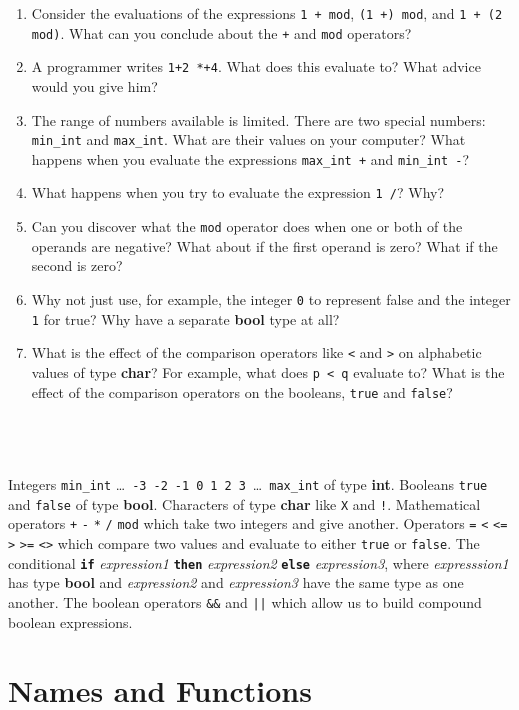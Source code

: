 \documentclass[]{book}
\newcommand\upquote[1]{\textquotesingle#1\textquotesingle}
\newcommand{\sofarstartingoff}{

\noindent 1

\noindent Integers \texttt{min\_int} \ldots\ \texttt{-3}\ \texttt{-2}\ \texttt{-1}\ \texttt{0}\ \texttt{1}\ \texttt{2}\ \texttt{3}\ \ldots\ \texttt{max\_int} of type \textbf{\textrm{int}}. Booleans \texttt{true} and \texttt{false} of type \textbf{\textrm{bool}}. \noindent Characters of type \textrm{\textbf{char}} like \texttt{\upquote{X}} and \texttt{\upquote{!}}. Mathematical operators \texttt{+} \texttt{-} \texttt{*} \texttt{/} \texttt{mod} which take two integers and give another. Operators \texttt{=} \texttt{<} \texttt{<=} \texttt{>} \texttt{>=} \texttt{<>} which compare two values and evaluate to either \texttt{true} or \texttt{false}. The conditional \textbf{\texttt{if}} \textit{expression1} \textbf{\texttt{then}} \textit{expression2} \textbf{\texttt{else}} \textit{expression3}, where \textit{expresssion1} has type \textrm{\textbf{bool}} and \textit{expression2} and \textit{expression3} have the same type as one another. The boolean operators \texttt{\&\&} and \texttt{||} which allow us to build compound boolean expressions.}
\begin{document}
\begin{enumerate}
\item Consider the evaluations of the expressions \texttt{1\! +\! mod}, \texttt{(1\! +)\! mod}, and \texttt{1\! +\! (2\! mod)}. What can you conclude about the \texttt{+} and \texttt{mod} operators?
\item A programmer writes \texttt{1+2\! *+4}. What does this evaluate to? What advice would you give him?
\item The range of numbers available is limited. There are two special numbers: \texttt{min\_int} and \texttt{max\_int}. What are their values on your computer? What happens when you evaluate the expressions \texttt{max\_int\! +} and \texttt{min\_int\! -}?
\item What happens when you try to evaluate the expression \texttt{1\! /}? Why?
\item Can you discover what the \texttt{mod} operator does when one or both of the operands are negative? What about if the first operand is zero? What if the second is zero?
\item Why not just use, for example, the integer \texttt{0} to represent false and the integer \texttt{1} for true? Why have a separate \textbf{\textrm{bool}} type at all?
\item What is the effect of the comparison operators like \texttt{<} and \texttt{>} on alphabetic values of type \textbf{\textrm{char}}? For example, what does \texttt{\upquote{p}\! <\! \upquote{q}} evaluate to? What is the effect of the comparison operators on the booleans, \texttt{true} and \texttt{false}?
\end{enumerate}

\cleardoublepage
\thispagestyle{empty}
\chapter*{}
\\

{\footnotesize
\sofarstartingoff
}


\thispagestyle{empty}

\chapter{Names and Functions}
\label{functions}
\end{document}
